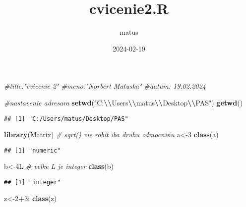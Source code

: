 \documentclass[
]{article}
\title{cvicenie2.R}
\author{matus}
\date{2024-02-19}
\newenvironment{Shaded}{\begin{snugshade}}{\end{snugshade}}
\newcommand{\CommentTok}[1]{\textcolor[rgb]{0.56,0.35,0.01}{\textit{#1}}}
\newcommand{\DecValTok}[1]{\textcolor[rgb]{0.00,0.00,0.81}{#1}}
\newcommand{\FunctionTok}[1]{\textcolor[rgb]{0.13,0.29,0.53}{\textbf{#1}}}
\newcommand{\NormalTok}[1]{#1}
\newcommand{\OtherTok}[1]{\textcolor[rgb]{0.56,0.35,0.01}{#1}}
\newcommand{\SpecialCharTok}[1]{\textcolor[rgb]{0.81,0.36,0.00}{\textbf{#1}}}
\newcommand{\StringTok}[1]{\textcolor[rgb]{0.31,0.60,0.02}{#1}}
\begin{document}
\maketitle

\begin{Shaded}
\begin{Highlighting}[]
\CommentTok{\#title:"cvicenie 2"}
\CommentTok{\#meno:"Norbert Matuska"}
\CommentTok{\#datum: 19.02.2024}

\CommentTok{\#nastavenie adresara}
\FunctionTok{setwd}\NormalTok{(}\StringTok{"C:}\SpecialCharTok{\textbackslash{}\textbackslash{}}\StringTok{Users}\SpecialCharTok{\textbackslash{}\textbackslash{}}\StringTok{matus}\SpecialCharTok{\textbackslash{}\textbackslash{}}\StringTok{Desktop}\SpecialCharTok{\textbackslash{}\textbackslash{}}\StringTok{PAS"}\NormalTok{)}
\FunctionTok{getwd}\NormalTok{()}
\end{Highlighting}
\end{Shaded}

\begin{verbatim}
## [1] "C:/Users/matus/Desktop/PAS"
\end{verbatim}

\begin{Shaded}
\begin{Highlighting}[]
\FunctionTok{library}\NormalTok{(Matrix)}
\CommentTok{\# sqrt() vie robit iba druhu odmocninu}
\NormalTok{a}\OtherTok{\textless{}{-}}\DecValTok{3}
\FunctionTok{class}\NormalTok{(a)}
\end{Highlighting}
\end{Shaded}

\begin{verbatim}
## [1] "numeric"
\end{verbatim}

\begin{Shaded}
\begin{Highlighting}[]
\NormalTok{b}\OtherTok{\textless{}{-}}\NormalTok{4L }\CommentTok{\# velke L je integer}
\FunctionTok{class}\NormalTok{(b)}
\end{Highlighting}
\end{Shaded}

\begin{verbatim}
## [1] "integer"
\end{verbatim}

\begin{Shaded}
\begin{Highlighting}[]
\NormalTok{z}\OtherTok{\textless{}{-}}\DecValTok{2}\SpecialCharTok{+}\NormalTok{3i}
\FunctionTok{class}\NormalTok{(z)}
\end{Highlighting}
\end{Shaded}
\end{document}
